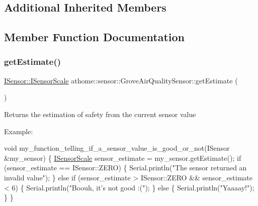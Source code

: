 \subsection*{Additional Inherited Members}


\subsection{Member Function Documentation}
\mbox{\label{classathome_1_1sensor_1_1_grove_air_quality_sensor_a3eeec77eb0bbf3932cdfa9d33a708e57}} 
\subsubsection{\texorpdfstring{get\+Estimate()}{getEstimate()}}
{\footnotesize\ttfamily \mbox{\hyperlink{classathome_1_1sensor_1_1_i_sensor_aa70bc27a4c17c86caf96cca776541ddf}{I\+Sensor\+::\+I\+Sensor\+Scale}} athome\+::sensor\+::\+Grove\+Air\+Quality\+Sensor\+::get\+Estimate (\begin{DoxyParamCaption}{ }\end{DoxyParamCaption})\hspace{0.3cm}{\ttfamily [virtual]}}

Returns the estimation of safety from the current sensor value

Example\+:


\begin{DoxyCode}
\textcolor{keywordtype}{void} my\_function\_telling\_if\_a\_sensor\_value\_is\_good\_or\_not(ISensor &my\_sensor) \{
  \mbox{\hyperlink{classathome_1_1sensor_1_1_i_sensor_aa70bc27a4c17c86caf96cca776541ddf}{ISensorScale}} sensor\_estimate = my\_sensor.getEstimate();
  \textcolor{keywordflow}{if} (sensor\_estimate == ISensor::ZERO) \{
    Serial.println(\textcolor{stringliteral}{"The sensor returned an invalid value"});
  \}
  \textcolor{keywordflow}{else} \textcolor{keywordflow}{if} (sensor\_estimate > ISensor::ZERO && sensor\_estimate < 6) \{
    Serial.println(\textcolor{stringliteral}{"Boouh, it's not good :("});
  \}
  \textcolor{keywordflow}{else} \{
    Serial.println(\textcolor{stringliteral}{"Yaaaay!"});
  \}
\}
\end{DoxyCode}
 

